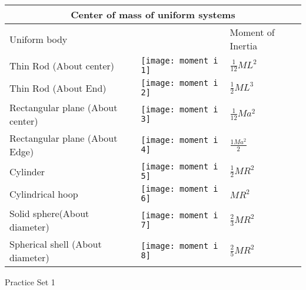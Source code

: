 \begin{table}[H]
	\centering
	\renewcommand*{\arraystretch}{1.5}
	\begin{tabular}{|p{4cm}|p{6cm}|p{3cm}|}
		\hline
		\multicolumn{3}{|c|}{\textbf{Center of mass of uniform systems}}\\\hline\hline
		\rowcolor{ocrel}Uniform body& & Moment of Inertia\\\hline
		Thin Rod (About center)&
		\texttt{[image: moment i 1]}
		&\textbf{$\frac{1}{12}ML^{2}$}   \\\hline 
		Thin Rod (About End)& 			\texttt{[image: moment i 2]} & \textbf{$\frac{1}{2}ML^{3}$}   \\\hline 
		Rectangular plane (About center)& \texttt{[image:  moment i 3]} &\textbf{$\frac{1}{12}Ma^{2}$}   \\\hline 
		Rectangular plane (About Edge)&	\texttt{[image:  moment i 4]} & \textbf{$\frac{1Ma^{2}}{2}$}   \\\hline 
		Cylinder& \texttt{[image: moment i 5]} &\textbf{$\frac{1}{2}MR^{2}$}   \\\hline
		Cylindrical hoop& \texttt{[image: moment i 6]} &\textbf{$MR^{2}$}   \\\hline
		Solid sphere(About diameter)& \texttt{[image: moment i 7]} &\textbf{$\frac{2}{3}MR^{2}$}   \\\hline
		Spherical shell (About diameter)& \texttt{[image: moment i 8]} &\textbf{$\frac{2}{5} MR^{2}$}   \\\hline
	\end{tabular}
\end{table}
\newpage
\begin{abox}
Practice Set 1
\end{abox}
